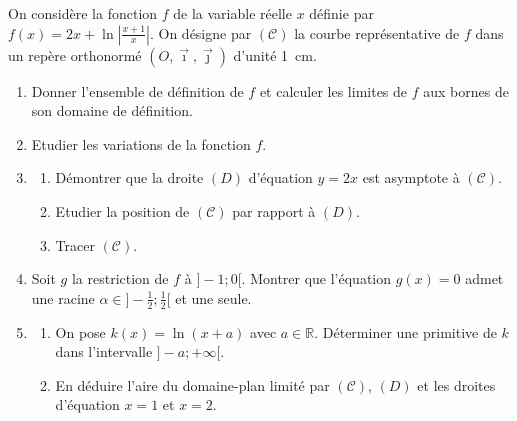 \begin{exo}
      On consid\`ere la fonction $f$ de la variable r\'eelle $x$ d\'efinie par $f(x) = 2 x + \ln \left| \frac{x + 1}{x} \right|$.
      On d\'esigne par $(\mathcal{C})$ la courbe repr\'esentative de $f$ dans un rep\`ere orthonorm\'e $(O,\vec{\imath}, \vec{\jmath})$ d'unit\'e 1~cm.
      \begin{enumerate}
      \item Donner l'ensemble de d\'efinition de $f$ et calculer les limites de $f$ aux bornes de son domaine de d\'efinition.
      \item Etudier les variations de la fonction $f$.
      \item 
            \begin{enumerate}
            \item D\'emontrer que la droite $(D)$ d'\'equation $y = 2x$ est asymptote \`a $(\mathcal{C})$.
            \item Etudier la position de $(\mathcal{C})$ par rapport \`a $(D)$.
            \item Tracer $(\mathcal{C})$.
            \end{enumerate}
      \item Soit $g$ la restriction de $f$ \`a $]-1 ; 0[$. Montrer que l'\'equation $g(x) = 0$ admet une racine $\alpha \in ]-\frac{1}{2} ; \frac{1}{2}[$ et une seule.
      \item 
           \begin{enumerate}
           \item On pose $k(x) = \ln (x + a)$ avec $a \in \mathbb{R}$.
                 D\'eterminer une primitive de $k$ dans l'intervalle $]-a ; + \infty[$.
           \item En d\'eduire l'aire du domaine-plan limit\'e par $(\mathcal{C})$, $(D)$ et les droites d'\'equation $x = 1$ et $x = 2$.
           \end{enumerate}
      \end{enumerate}
\end{exo}
